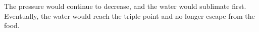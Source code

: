 The pressure would continue to decrease, and the water would sublimate first.  
Eventually, the water would reach the triple point and no longer escape from the food.